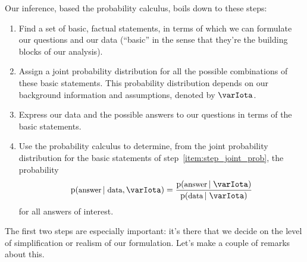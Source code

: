 \documentclass[\ifafour a4paper,12pt,\else a5paper,10pt,\fi%
onecolumn,oneside,article,%
british%
]{memoir}
\theoremstyle{remark}
\theoremstyle{innote}
\newcommand*{\pf}{\mathrm{p}}%
\renewcommand*{\|}[1][]{\nonscript\,#1\vert\nonscript\;\mathopen{}}
\newcommand*{\yI}{\varIota}
\begin{document}
Our inference, based the probability calculus, boils down to these steps:
\begin{enumerate}[label=\arabic*.]
\item \label{item:step_statements} Find a set of basic, factual
  statements, in terms of which we can formulate our questions and our
  data (\enquote{basic} in the sense that they're the building blocks of
  our analysis).

\item \label{item:step_joint_prob} Assign a joint probability
  distribution for all the possible combinations of these basic statements. This
  probability distribution depends on our background information and
  assumptions, denoted by $\yI$.

\item \label{item:step_formulate_question_data} Express our data and the possible
  answers to our questions in terms of the basic statements.

\item \label{item:step_calculate_probabilities} Use the probability
  calculus to determine, from the joint probability distribution for the
  basic statements of step~\ref{item:step_joint_prob}, the probability
  \begin{equation}
    \label{eq:basic_conditional_prob}
    \pf(\text{\small answer} \| \text{\small data}, \yI) =
    \frac{\pf(\text{\small answer} \| \yI)}
    {\pf(\text{\small data} \| \yI)}
  \end{equation}
  for all answers of interest.
\end{enumerate}


\bigskip

The first two steps are especially important: it's there that we decide on
the level of simplification or realism of our formulation. Let's make a
couple of remarks about this.
\end{document}
